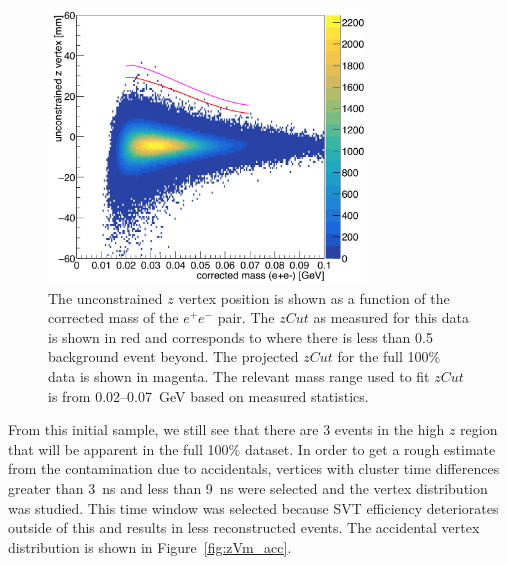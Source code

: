 \begin{figure}[htb]
  \centering
      \includegraphics[width=0.75\textwidth]{pics/searching/zVm_bl_L1L1.png}
  \caption[Vertex position vs mass for the 10$\%$ L1L1 data]{The unconstrained $z$ vertex position is shown as a function of the corrected mass of the $e^+e^-$ pair. The $zCut$ as measured for this data is shown in red and corresponds to where there is less than 0.5 background event beyond. The projected $zCut$ for the full 100$\%$ data is shown in magenta. The relevant mass range used to fit $zCut$ is from 0.02--0.07~GeV based on measured statistics.}
  \label{fig:zVm_bl}
\end{figure} 

From this initial sample, we still see that there are 3 events in the high $z$ region that will be apparent in the full 100$\%$ dataset. In order to get a rough estimate from the contamination due to accidentals, vertices with cluster time differences greater than 3~ns and less than 9~ns were selected and the vertex distribution was studied. This time window was selected because SVT efficiency deteriorates outside of this and results in less reconstructed events. The accidental vertex distribution is shown in Figure~\ref{fig:zVm_acc}.

